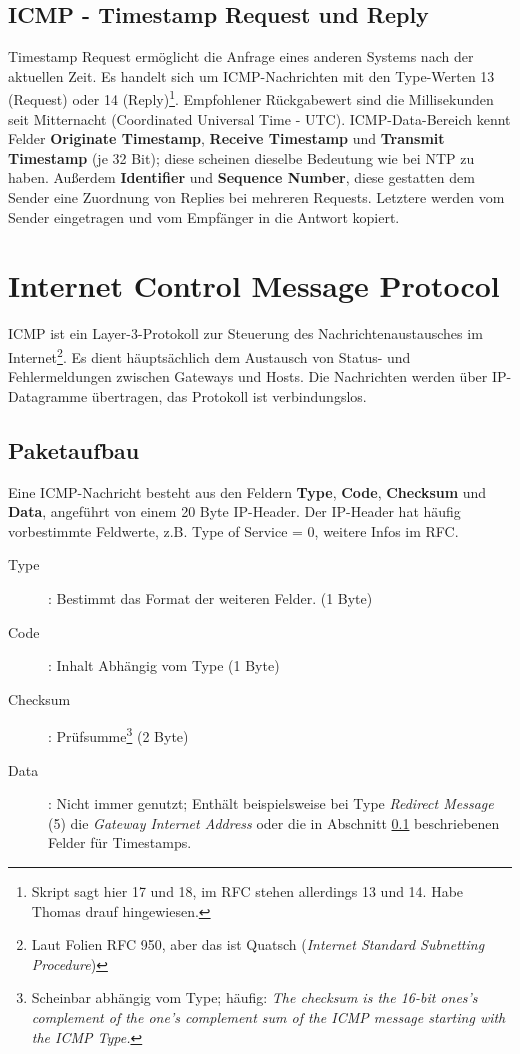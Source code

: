 \documentclass{article} %
\begin{document}
\subsection{ICMP - Timestamp Request und Reply}
\label{subsec:icmptime}

Timestamp Request\cite{rfc792} ermöglicht die Anfrage eines anderen Systems nach der aktuellen Zeit.
Es handelt sich um ICMP-Nachrichten mit den Type-Werten 13 (Request) oder 14 (Reply)\footnote{Skript sagt hier 17 und 18, im RFC stehen allerdings 13 und 14. Habe Thomas drauf hingewiesen.}.
Empfohlener Rückgabewert sind die Millisekunden seit Mitternacht (Coordinated Universal Time - UTC).
ICMP-Data-Bereich kennt Felder \textbf{Originate Timestamp}, \textbf{Receive Timestamp} und \textbf{Transmit Timestamp} (je 32 Bit); diese scheinen dieselbe Bedeutung wie bei NTP zu haben.
Außerdem \textbf{Identifier} und \textbf{Sequence Number}, diese gestatten dem Sender eine Zuordnung von Replies bei mehreren Requests.
Letztere werden vom Sender eingetragen und vom Empfänger in die Antwort kopiert.

\section{Internet Control Message Protocol}

ICMP ist ein Layer-3-Protokoll zur Steuerung des Nachrichtenaustausches im Internet\cite{rfc792}\footnote{Laut Folien RFC 950\cite{rfc950}, aber das ist Quatsch (\emph{Internet Standard Subnetting Procedure})}.
Es dient häuptsächlich dem Austausch von Status- und Fehlermeldungen zwischen Gateways und Hosts.
Die Nachrichten werden über IP-Datagramme übertragen, das Protokoll ist verbindungslos.

\subsection{Paketaufbau}
Eine ICMP-Nachricht besteht aus den Feldern \textbf{Type}, \textbf{Code}, \textbf{Checksum} und \textbf{Data}, angeführt von einem 20 Byte IP-Header.
Der IP-Header hat häufig vorbestimmte Feldwerte, z.B. Type of Service = 0, weitere Infos im RFC.

\begin{description}
	\item[Type]: Bestimmt das Format der weiteren  Felder. (1 Byte)
	\item[Code]: Inhalt Abhängig vom Type (1 Byte)
	\item[Checksum]: Prüfsumme\footnote{Scheinbar abhängig vom Type; häufig: \emph{The checksum is the 16-bit ones's complement of the one's complement sum of the ICMP message starting with the ICMP Type.}} (2 Byte) 
	\item[Data]: Nicht immer genutzt; Enthält beispielsweise bei Type \emph{Redirect Message} (5) die \emph{Gateway Internet Address} oder die in Abschnitt \ref{subsec:icmptime} beschriebenen Felder für Timestamps.
\end{description}
\end{document}
